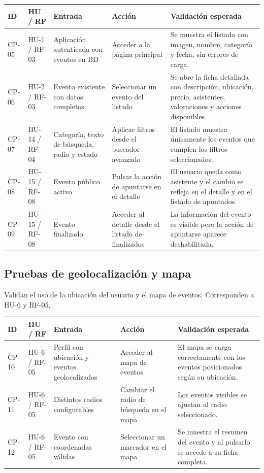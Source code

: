 \begin{longtable}{|L{1.3cm}|L{1.6cm}|L{3cm}|L{3.8cm}|L{4.3cm}|}
\hline
\textbf{ID} & \textbf{HU / RF} & \textbf{Entrada} & \textbf{Acción} & \textbf{Validación esperada} \\
\hline
{}\label{cp:05}CP-05 & HU-1 / RF-03 & Aplicación autenticada con eventos en BD & Acceder a la página principal & Se muestra el listado con imagen, nombre, categoría y fecha, sin errores de carga. \\
\hline
{}\label{cp:06}CP-06 & HU-2 / RF-03 & Evento existente con datos completos & Seleccionar un evento del listado & Se abre la ficha detallada con descripción, ubicación, precio, asistentes, valoraciones y acciones disponibles. \\
\hline
{}\label{cp:07}CP-07 & HU-14 / RF-04 & Categoría, texto de búsqueda, radio y estado & Aplicar filtros desde el buscador avanzado & El listado muestra únicamente los eventos que cumplen los filtros seleccionados. \\
\hline
{}\label{cp:08}CP-08 & HU-15 / RF-08 & Evento público activo & Pulsar la acción de apuntarse en el detalle & El usuario queda como asistente y el cambio se refleja en el detalle y en el listado de apuntados. \\
\hline
{}\label{cp:09}CP-09 & HU-15 / RF-08 & Evento finalizado & Acceder al detalle desde el listado de finalizados & La información del evento es visible pero la acción de apuntarse aparece deshabilitada. \\
\hline
\end{longtable}

\subsection{Pruebas de geolocalización y mapa}

Validan el uso de la ubicación del usuario y el mapa de eventos. Corresponden a HU-6 y RF-05.

\begin{longtable}{|L{1.3cm}|L{1.6cm}|L{3cm}|L{3.8cm}|L{4.3cm}|}
\hline
\textbf{ID} & \textbf{HU / RF} & \textbf{Entrada} & \textbf{Acción} & \textbf{Validación esperada} \\
\hline
{}\label{cp:10}CP-10 & HU-6 / RF-05 & Perfil con ubicación y eventos geolocalizados & Acceder al mapa de eventos & El mapa se carga correctamente con los eventos posicionados según su ubicación. \\
\hline
{}\label{cp:11}CP-11 & HU-6 / RF-05 & Distintos radios configurables & Cambiar el radio de búsqueda en el mapa & Los eventos visibles se ajustan al radio seleccionado. \\
\hline
{}\label{cp:12}CP-12 & HU-6 / RF-05 & Evento con coordenadas válidas & Seleccionar un marcador en el mapa & Se muestra el resumen del evento y al pulsarlo se accede a su ficha completa. \\
\hline
\end{longtable}

